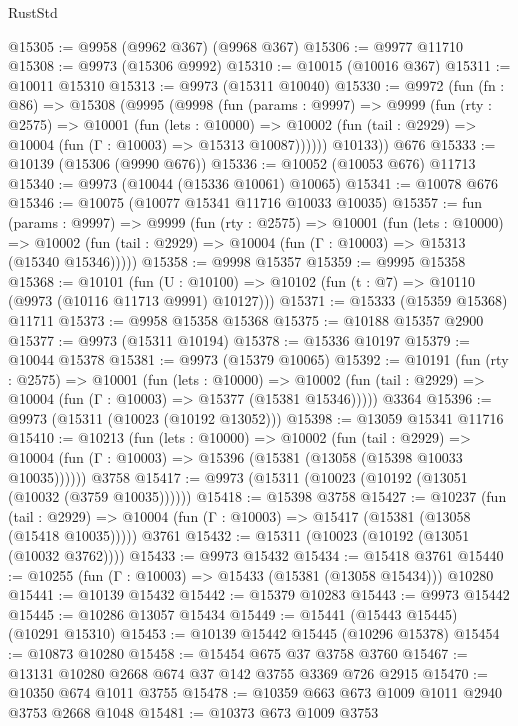 \begin{lexlean}{RustStd}
\begin{coremodule}
@15305 := @9958 (@9962 @367) (@9968 @367)
@15306 := @9977 @11710
@15308 := @9973 (@15306 @9992)
@15310 := @10015 (@10016 @367)
@15311 := @10011 @15310
@15313 := @9973 (@15311 @10040)
@15330 := @9972
    (fun (fn : @86) =>
    @15308
      (@9995
        (@9998
          (fun (params : @9997) =>
          @9999
            (fun (rty : @2575) =>
            @10001
              (fun (lets : @10000) =>
              @10002 (fun (tail : @2929) => @10004 (fun (Γ : @10003) => @15313 @10087))))))
        @10133))
    @676
@15333 := @10139 (@15306 (@9990 @676))
@15336 := @10052 (@10053 @676) @11713
@15340 := @9973 (@10044 (@15336 @10061) @10065)
@15341 := @10078 @676
@15346 := @10075 (@10077 @15341 @11716 @10033 @10035)
@15357 := fun (params : @9997) =>
  @9999
    (fun (rty : @2575) =>
    @10001
      (fun (lets : @10000) =>
      @10002 (fun (tail : @2929) => @10004 (fun (Γ : @10003) => @15313 (@15340 @15346)))))
@15358 := @9998 @15357
@15359 := @9995 @15358
@15368 := @10101
    (fun (U : @10100) => @10102 (fun (t : @7) => @10110 (@9973 (@10116 @11713 @9991) @10127)))
@15371 := @15333 (@15359 @15368) @11711
@15373 := @9958 @15358 @15368
@15375 := @10188 @15357 @2900
@15377 := @9973 (@15311 @10194)
@15378 := @15336 @10197
@15379 := @10044 @15378
@15381 := @9973 (@15379 @10065)
@15392 := @10191
    (fun (rty : @2575) =>
    @10001
      (fun (lets : @10000) =>
      @10002 (fun (tail : @2929) => @10004 (fun (Γ : @10003) => @15377 (@15381 @15346)))))
    @3364
@15396 := @9973 (@15311 (@10023 (@10192 @13052)))
@15398 := @13059 @15341 @11716
@15410 := @10213
    (fun (lets : @10000) =>
    @10002
      (fun (tail : @2929) =>
      @10004 (fun (Γ : @10003) => @15396 (@15381 (@13058 (@15398 @10033 @10035))))))
    @3758
@15417 := @9973 (@15311 (@10023 (@10192 (@13051 (@10032 (@3759 @10035))))))
@15418 := @15398 @3758
@15427 := @10237
    (fun (tail : @2929) => @10004 (fun (Γ : @10003) => @15417 (@15381 (@13058 (@15418 @10035)))))
    @3761
@15432 := @15311 (@10023 (@10192 (@13051 (@10032 @3762))))
@15433 := @9973 @15432
@15434 := @15418 @3761
@15440 := @10255 (fun (Γ : @10003) => @15433 (@15381 (@13058 @15434))) @10280
@15441 := @10139 @15432
@15442 := @15379 @10283
@15443 := @9973 @15442
@15445 := @10286 @13057 @15434
@15449 := @15441 (@15443 @15445) (@10291 @15310)
@15453 := @10139 @15442 @15445 (@10296 @15378)
@15454 := @10873 @10280
@15458 := @15454 @675 @37 @3758 @3760
@15467 := @13131 @10280 @2668 @674 @37 @142 @3755 @3369 @726 @2915
@15470 := @10350 @674 @1011 @3755
@15478 := @10359 @663 @673 @1009 @1011 @2940 @3753 @2668 @1048
@15481 := @10373 @673 @1009 @3753

\end{coremodule}
\end{lexlean}

